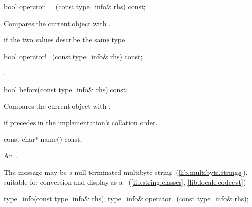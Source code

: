 %
\begin{itemdecl}
bool operator==(const type_info& rhs) const;
\end{itemdecl}

\begin{itemdescr}
\pnum
\effects
Compares the current object with .

\pnum
\returns
{}
if the two values describe the same type.
\end{itemdescr}

%
\begin{itemdecl}
bool operator!=(const type_info& rhs) const;
\end{itemdecl}

\begin{itemdescr}
\pnum
\returns
{}.
\end{itemdescr}

%
\begin{itemdecl}
bool before(const type_info& rhs) const;
\end{itemdecl}

\begin{itemdescr}
\pnum
\effects
Compares the current object with .

\pnum
\returns
{}
if
precedes  in the implementation's collation order.
\end{itemdescr}

%
\begin{itemdecl}
const char* name() const;
\end{itemdecl}

\begin{itemdescr}
\pnum
\returns
An  \ntbs.

\pnum
\notes
The message may be a null-terminated multibyte string~(\ref{lib.multibyte.strings}),
suitable for conversion and display as a
~(\ref{lib.string.classes}, \ref{lib.locale.codecvt})
\end{itemdescr}

\begin{itemdecl}
type_info(const type_info& rhs);
type_info& operator=(const type_info& rhs);
\end{itemdecl}

